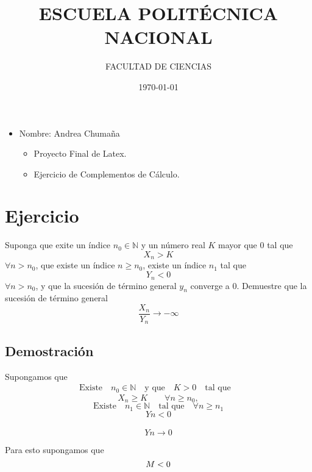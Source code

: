 \documentclass[a4paper, 10pt]{article}
\title{ESCUELA POLITÉCNICA NACIONAL}
\author{FACULTAD DE CIENCIAS}
\date{\today}
\begin{document}
\maketitle
\begin{itemize}
 \item Nombre: Andrea Chumaña
       \begin{itemize}
        \item Proyecto Final de Latex.
         \item Ejercicio de Complementos de Cálculo.
     \end{itemize}
\end{itemize}
\section{Ejercicio}

{\color{magenta} Suponga que exite un índice \(n_0\in \mathbb{N}\) y  un número real \( K\) mayor que 0 tal que
\[ X_n > K
\]
\(\forall n > n_0\), que existe  un índice \(n \geq n_0 \), existe un índice \(n_1\) tal que
\[Y_n < 0
\]
\(\forall n > n_0\), y que la sucesión de término general \(y_n\) converge a 0.
Demuestre que la sucesión de término general
\[\dfrac{X_n}{Y_n} \rightarrow -\infty\]}

\subsection*{Demostración}
Supongamos que
\begin{align*}
\text{Existe}\quad n_0 \in \mathbb{N} \quad \text{y que} 
\quad K > 0 \quad \text{tal que}&
\end{align*}
\begin{equation}
X_n\geq K \qquad \forall n \geq n_0,
\end{equation}
\begin{equation*}
\text{Existe} \quad n_1 \in \mathbb{N} \quad \text{tal que}\quad \forall n \geq n_1
\end{equation*}
\begin{equation}
Yn < 0
\end{equation}
\\
\begin{equation}
Yn\rightarrow 0
\end{equation}

Para esto supongamos que 
\begin{equation}
M < 0 \\
\end{equation}
\end{document}
